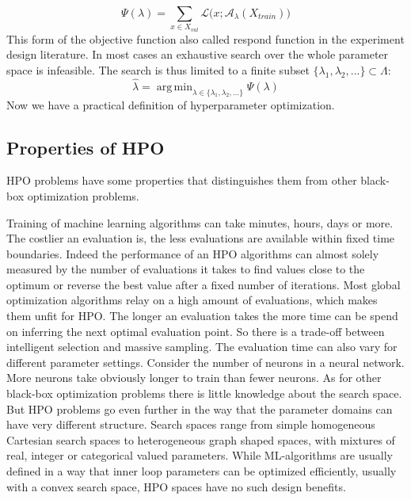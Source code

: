 \documentclass[english]{article}
\DeclareMathOperator*{\argmin}{arg\,min}
\begin{document}
\begin{equation}
  \Psi(\lambda) = \sum_{x \in X_{val}} \mathcal{L}\big(x;\mathcal{A}_\lambda(X_{train})\big)
\end{equation}
This form of the objective function also called respond function in the experiment design literature. In most cases an exhaustive search over the whole parameter space is infeasible. The search is thus limited to a finite subset $\{\lambda_1, \lambda_2, ... \} \subset \Lambda$:
\begin{equation}
  \hat{\lambda} = \argmin_{\lambda \in \{\lambda_1, \lambda_2, ... \}} \Psi(\lambda)
\label{empirical hypa_opt_1}
\end{equation}
Now we have a practical definition of hyperparameter optimization.

\subsection{Properties of HPO}
HPO problems have some properties that distinguishes them from other black-box optimization problems.

Training of machine learning algorithms can take minutes, hours, days or more. The costlier an evaluation is, the less evaluations are available within fixed time boundaries. Indeed the performance of an HPO algorithms can almost solely measured by the number of evaluations it takes to find values close to the optimum or reverse the best value after a fixed number of iterations. Most global optimization algorithms relay on a high amount of evaluations, which makes them unfit for HPO. The longer an evaluation takes the more time can be spend on inferring the next optimal evaluation point. So there is a trade-off between intelligent selection and massive sampling. The evaluation time can also vary for different parameter settings. Consider the number of neurons in a neural network. More neurons take obviously longer to train than fewer neurons.
As for other black-box optimization problems there is little knowledge about the search space. But HPO problems go even further in the way that the parameter domains can have very different structure. Search spaces range from simple homogeneous Cartesian search spaces to heterogeneous graph shaped spaces, with mixtures of real, integer or categorical valued parameters. While ML-algorithms are usually defined in a way that inner loop parameters can be optimized efficiently, usually with a convex search space, HPO spaces have no such design benefits.
\end{document}
